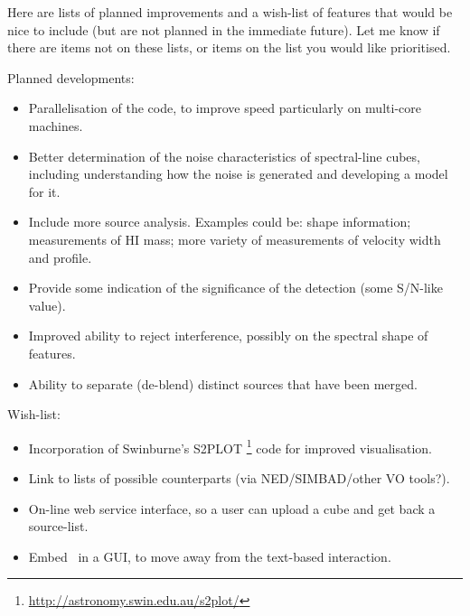 
Here are lists of planned improvements and a wish-list of
features that would be nice to include (but are not planned in the
immediate future). Let me know if there are items not on these lists,
or items on the list you would like prioritised.

Planned developments:
\begin{itemize}
\item Parallelisation of the code, to improve speed particularly on
multi-core machines.

\item Better determination of the noise characteristics of
  spectral-line cubes, including understanding how the noise is
  generated and developing a model for it. 
  
\item Include more source analysis. Examples could be: shape
  information; measurements of HI mass; more variety of measurements
  of velocity width and profile. 

\item Provide some indication of the significance of the detection
  (\ie some S/N-like value). 

\item Improved ability to reject interference, possibly on the
  spectral shape of features.

\item Ability to separate (de-blend) distinct sources that have been
  merged.
\end{itemize}

Wish-list:
\begin{itemize}
\item Incorporation of Swinburne's S2PLOT
\footnote{\href{http://astronomy.swin.edu.au/s2plot/}
{http://astronomy.swin.edu.au/s2plot/}} code for improved
visualisation. 
\item Link to lists of possible counterparts (\eg via NED/SIMBAD/other
  VO tools?). 

\item On-line web service interface, so a user can upload a cube and
  get back a source-list.

\item Embed \duchamp\ in a GUI, to move away from the text-based
  interaction.
\end{itemize}

